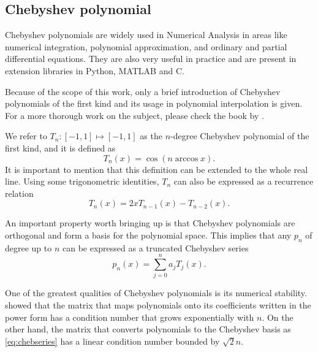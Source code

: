 \subsection{Chebyshev polynomial}

Chebyshev polynomials are widely used in Numerical Analysis in areas like numerical integration, polynomial approximation, and ordinary and partial differential equations.
They are also very useful in practice and are present in extension libraries in Python, MATLAB and C.

Because of the scope of this work, only a brief introduction of Chebyshev polynomials of the first kind and its usage in polynomial interpolation is given. For a more thorough work on the subject, please check the book by .

We refer to $T_n : [-1, 1] \mapsto [-1, 1]$ as the $n$-degree Chebyshev polynomial of the first kind, and it is defined as
\begin{equation}
T_n(x) = \cos({n\arccos x}).
\end{equation}
It is important to mention that this definition can be extended to the whole real line. Using some trigonometric identities, $T_n$ can also be expressed as a recurrence relation
\begin{equation}
T_n(x) = 2xT_{n-1}(x) - T_{n-2}(x).
\end{equation}

An important property worth bringing up is that Chebyshev polynomials are orthogonal and form a basis for the polynomial space. This implies that any $p_n$ of degree up to $n$ can be expressed as a truncated Chebyshev series
\begin{equation}\label{eq:chebseries}
p_n(x) = \sum_{j=0}^{n} a_j T_j(x).
\end{equation}

One of the greatest qualities of Chebyshev polynomials is its numerical stability.  showed that the matrix that maps polynomials onto its coefficients written in the power form has a condition number that grows exponentially with $n$. On the other hand, the matrix that converts polynomials to the Chebyshev basis as \autoref{eq:chebseries} has a linear condition number bounded by $\sqrt{2}n$.

